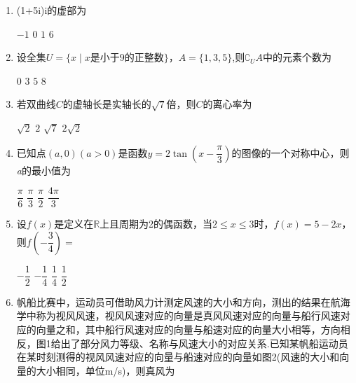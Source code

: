 \documentclass[12pt,a4paper]{article}
\begin{document}
	\begin{enumerate}[leftmargin=*,label=\arabic*.,itemsep=0.8ex]
		\item (1+5i)i的虚部为
		
		\begin{choicesFour}
			\choice $-1$ \choice $0$ \choice $1$ \choice $6$
		\end{choicesFour}
		
		\item
		设全集$U=\{x \mid x\text{是小于9的正整数}\}$，$A=\{1,3,5\}$,则$\complement_U A$中的元素个数为
		
		\begin{choicesFour}
			\choice $0$ \choice $3$ \choice $5$ \choice $8$
		\end{choicesFour}
		
		\item 若双曲线$C$的虚轴长是实轴长的$\sqrt{7}$倍，则$C$的离心率为
		
		\begin{choicesFour}
			\choice $\sqrt{2}$ \choice $2$ \choice $\sqrt{7}$ \choice $2\sqrt{2}$
		\end{choicesFour}
		
		\item
		已知点$(a,0)(a>0)$是函数$y=2\tan(x-\dfrac{\pi}{3})$的图像的一个对称中心，则\textit{a}的最小值为
		
		\begin{choicesFour}
			\choice $\dfrac{\pi}{6}$ \choice $\dfrac{\pi}{3}$ \choice $\dfrac{\pi}{2}$ \choice $\dfrac{4\pi}{3}$
		\end{choicesFour}
		
		\item 设$f(x)$是定义在$\mathbb{R}$上且周期为2的偶函数，当$2 \leq x\leq 3$时，$f(x)=5-2x$，则$f\left(-\dfrac{3}{4}\right)=$
		
		\begin{choicesFour}
			\choice $-\dfrac{1}{2}$ \choice $-\dfrac{1}{4}$ \choice $\dfrac{1}{4}$ \choice $\dfrac{1}{2}$
		\end{choicesFour}
		
		\item 帆船比赛中，运动员可借助风力计测定风速的大小和方向，测出的结果在航海学中称为视风风速，视风风速对应的向量是真风风速对应的向量与船行风速对应的向量之和，其中船行风速对应的向量与船速对应的向量大小相等，方向相反，图1给出了部分风力等级、名称与风速大小的对应关系.已知某帆船运动员在某时刻测得的视风风速对应的向量与船速对应的向量如图2(风速的大小和向量的大小相同，单位m/s)，则真风为
		

\end{enumerate}
\end{document}

